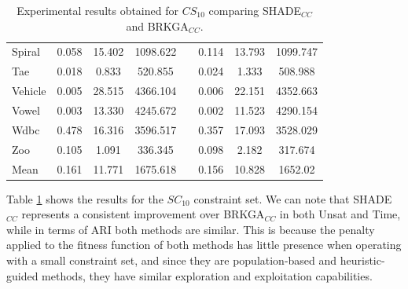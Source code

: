 \documentclass[review]{elsarticle}
\begin{document}
\begin{table}[!h]
{\begin{tabular}{l ccc c ccc}
			Spiral & 0.058 & 15.402 & 1098.622 && 0.114 & 13.793 & 1099.747 \\
			Tae & 0.018 & 0.833 & 520.855 && 0.024 & 1.333 & 508.988 \\
			Vehicle & 0.005 & 28.515 & 4366.104 && 0.006 & 22.151 & 4352.663 \\
			Vowel & 0.003 & 13.330 & 4245.672 && 0.002 & 11.523 & 4290.154 \\
			Wdbc & 0.478 & 16.316 & 3596.517 && 0.357 & 17.093 & 3528.029 \\
			Zoo & 0.105 & 1.091 & 336.345 && 0.098 & 2.182 & 317.674 \\
			\hline
			Mean & 0.161 & 11.771 & 1675.618 && 0.156 & 10.828 & 1652.02 \\
			\hline

		\end{tabular}}

	\caption{Experimental results obtained for $CS_{10}$ comparing SHADE$_{CC}$ and BRKGA$_{CC}$.}
	\label{tab:results10}
\end{table}

Table \ref{tab:results10} shows the results for the $SC_{10}$ constraint set. We can note that SHADE$_{CC}$ represents a consistent improvement over BRKGA$_{CC}$ in both Unsat and Time, while in terms of ARI both methods are similar. This is because the penalty applied to the fitness function of both methods has little presence when operating with a small constraint set, and since they are population-based and heuristic-guided methods, they have similar exploration and exploitation capabilities.
\end{document}

